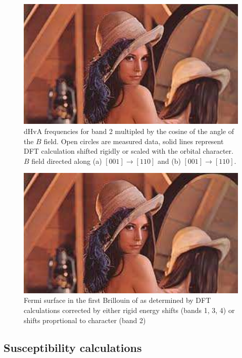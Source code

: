 \begin{figure}[h!]
    \begin{center}
        \includegraphics[scale=0.7]{Misc/TODO}
        \caption{dHvA frequencies for band 2 multipled by the cosine of the angle of the $B$ field. Open circles are measured data, solid lines represent DFT calculation shifted rigidly or scaled with the \DzTwo orbital character. $B$ field directed along (a) $[001]\rightarrow[110]$ and (b) $[001]\rightarrow[110]$.}
        \label{Fig:3:FinalRotPlot}
    \end{center}
\end{figure}
\begin{figure}[h!]
    \begin{center}
        \includegraphics[scale=0.7]{Misc/TODO}
        \caption{Fermi surface in the first Brillouin of \BaFeP as determined by DFT calculations corrected by either rigid energy shifts (bands 1, 3, 4) or shifts proprtional to \DzTwo character (band 2)}
        \label{Fig:3:DFTCorrectedUnitCell}
    \end{center}
\end{figure}


\subsection{Susceptibility calculations}
\label{Sec:SubsceptibilityCalculation}
